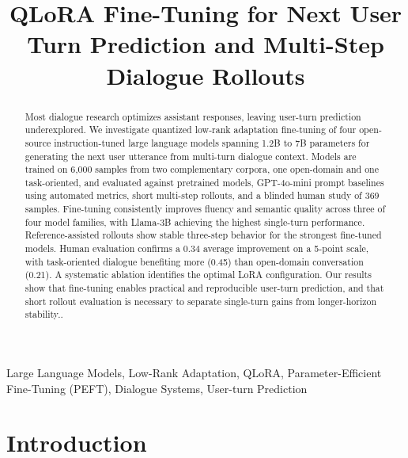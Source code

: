 \documentclass[conference]{IEEEtran}
\begin{document}
\title{QLoRA Fine-Tuning for Next User Turn Prediction and Multi-Step Dialogue Rollouts}

\author{
}
\maketitle

\begin{abstract}
Most dialogue research optimizes assistant responses, leaving user-turn prediction underexplored. We investigate quantized low-rank adaptation fine-tuning of four open-source instruction-tuned large language models spanning 1.2B to 7B parameters for generating the next user utterance from multi-turn dialogue context. Models are trained on 6{,}000 samples from two complementary corpora, one open-domain and one task-oriented, and evaluated against pretrained models, GPT-4o-mini prompt baselines using automated metrics, short multi-step rollouts, and a blinded human study of 369 samples. Fine-tuning consistently improves fluency and semantic quality across three of four model families, with Llama-3B achieving the highest single-turn performance. Reference-assisted rollouts show stable three-step behavior for the strongest fine-tuned models. Human evaluation confirms a 0.34 average improvement on a 5-point scale, with task-oriented dialogue benefiting more (0.45) than open-domain conversation (0.21). A systematic ablation identifies the optimal LoRA configuration. Our results show that fine-tuning enables practical and reproducible user-turn prediction, and that short rollout evaluation is necessary to separate single-turn gains from longer-horizon stability..
\end{abstract}

\begin{IEEEkeywords}
Large Language Models, Low-Rank Adaptation, QLoRA, Parameter-Efficient Fine-Tuning (PEFT), Dialogue Systems, User-turn Prediction
\end{IEEEkeywords}

\section{Introduction}
\end{document}
